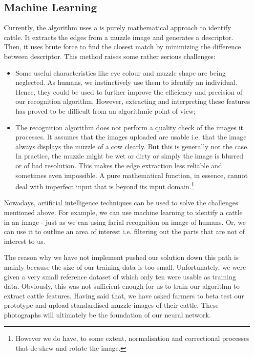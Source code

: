 \subsection{Machine Learning}

Currently, the algorithm uses a is purely mathematical approach to identify cattle. It extracts the edges from a muzzle image and generates a descriptor. Then, it uses brute force to find the closest match by minimizing the difference between descriptor. This method raises some rather serious challenges:

\begin{itemize}
	\item Some useful characteristics like eye colour and muzzle shape are being neglected. As humans, we instinctively use them to identify an individual. Hence, they could be used to further improve the efficiency and precision of our recognition algorithm. However, extracting and interpreting these features has proved to be difficult from an algorithmic point of view;
	\item The recognition algorithm does not perform a quality check of the images it processes. It assumes that the images uploaded are usable i.e. that the image always displays the muzzle of a cow clearly. But this is generally not the case. In practice, the muzzle might be wet or dirty or simply the image is blurred or of bad resolution. This makes the edge extraction less reliable and sometimes even impossible. A pure mathematical function, in essence, cannot deal with imperfect input that is beyond its input domain.\footnote{However we do have, to some extent, normalisation and correctional processes that de-skew and rotate the image.}
\end{itemize}

Nowadays, artificial intelligence techniques can be used to solve the challenges mentioned above. For example, we can use machine learning to identify a cattle in an image - just as we can using facial recognition on image of humans. Or, we can use it to outline an area of interest i.e. filtering out the parts that are not of interest to us.

The reason why we have not implement pushed our solution down this path is mainly because the size of our training data is too small. Unfortunately, we were given a very small reference dataset of which only ten were usable as training data. Obviously, this was not sufficient enough for us to train our algorithm to extract cattle features. Having said that, we have asked farmers to beta test our prototype and upload standardised muzzle images of their cattle. These photographs will ultimately be the foundation of our neural network.

